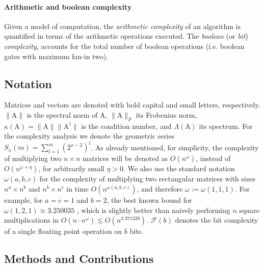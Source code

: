 \documentclass{article}
\newcommand\matA{\boldsymbol{\mathrm{A}}}
\newcommand{\flopcost}{\mathcal{F}}
\begin{document}
    \paragraph*{Arithmetic and boolean complexity} Given a model of computation, the \textit{arithmetic complexity} of an algorithm is quantified in terms of the arithmetic operations executed. The \textit{boolean} (or \textit{bit}) \textit{complexity}, accounts for the total number of boolean operations (i.e. boolean gates with maximum fan-in two).

\subsection{Notation}
Matrices and vectors are denoted with bold capital and small letters, respectively. 
$\lVert \matA\rVert$ is the spectral norm of $\matA$, $\lVert \matA\rVert_F$ its Frobenius norm, $\kappa(\matA)=\|\matA\|\|\matA^{\dagger}\|$ is the condition number, and $\Lambda(\matA)$ its spectrum. For the complexity analysis we denote the geometric series $S_{x}(m)=\sum_{l=1}^m (2^{x-2})^l$. As already mentioned, for simplicity, the complexity of multiplying two $n\times n$ matrices will be denoted as $O(n^\omega)$, instead of $O(n^{\omega+\eta})$, for arbitrarily small $\eta>0$. 
We also use the standard notation $\omega(a,b,c)$ for the complexity of multiplying two rectangular matrices with sizes $n^{a}\times n^b$ and $n^b\times n^c$ in time $O(n^{\omega(a,b,c)})$, and therefore $\omega:=\omega(1,1,1)$. For example, for $a=c=1$ and $b=2$, the best known bound for $\omega(1,2,1)\approx 3.250035$ \cite{alman2024more}, which is slightly better than naively performing $n$ square multiplications in  $O(n\cdot n^{\omega})\lesssim O(n^{3.371339})$. $\flopcost(b)$ denotes the bit complexity of a single floating point operation on $b$ bits. 

\subsection{Methods and Contributions}
    
\end{document}
